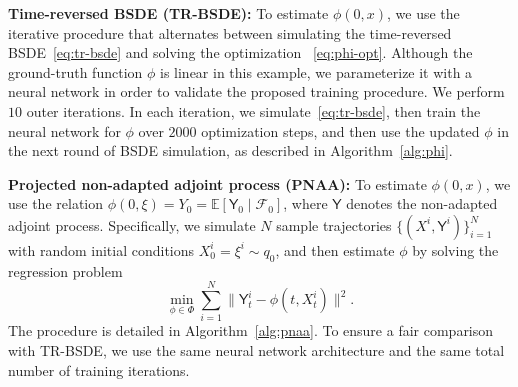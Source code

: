 \documentclass[letterpaper, 10 pt, conference]{ieeeconf}  %
\def\Expect{{\mathbb E}}
\newcommand{\Yn}{\mathsf Y}
\begin{document}
\medskip 
\noindent
{\bf Time-reversed BSDE (TR-BSDE):} To estimate $\phi(0,x)$, we use the iterative procedure that alternates between simulating the time-reversed BSDE~\eqref{eq:tr-bsde} and solving the optimization ~\eqref{eq:phi-opt}. Although the ground-truth function $\phi$ is linear in this example, we parameterize it with a neural network in order to validate the proposed training procedure. We perform $10$ outer iterations. In each iteration, we simulate~\eqref{eq:tr-bsde}, then train the neural network for $\phi$ over $2000$ optimization steps, and then use the updated $\phi$ in the next round of BSDE simulation, as described in Algorithm~\ref{alg:phi}.

\medskip 
\noindent
{\bf Projected non-adapted adjoint process (PNAA):}   To estimate $\phi(0,x)$, we use the relation $\phi(0,\xi)=Y_0=\Expect[\Yn_0 \mid \mathcal F_0]$, where $\Yn$ denotes the non-adapted adjoint process. Specifically, we simulate $N$ sample trajectories $\{(X^i,\Yn^i)\}_{i=1}^N$ with random initial conditions $X^i_0=\xi^i\sim q_0$, and then estimate $\phi$ by solving the regression problem 
\begin{equation}\label{eq:pnaa-opt}
    \min_{\phi \in \Phi}\sum_{i=1}^N \| \Yn^i_t - \phi(t,X^i_t)\|^2.
\end{equation}
The procedure is detailed in Algorithm~\ref{alg:pnaa}.
To ensure a fair comparison with TR-BSDE, we use the same neural network architecture and the same total number of training iterations.
\end{document}
